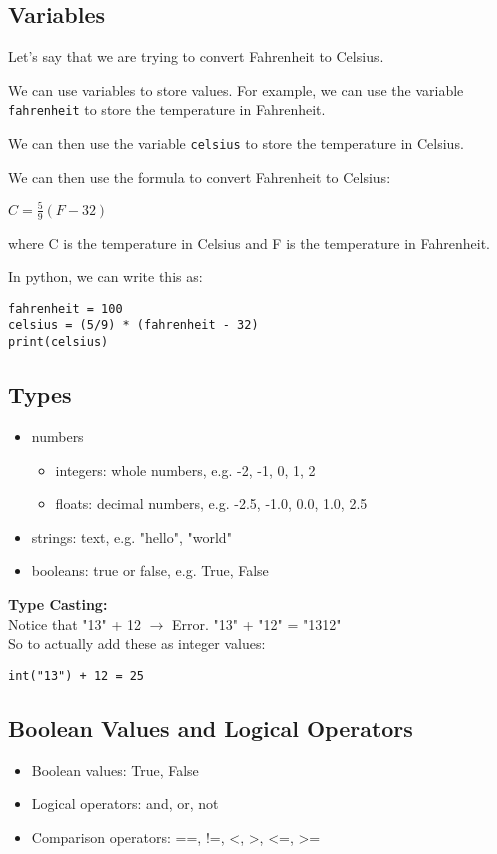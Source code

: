 \documentclass[11pt]{article}
\begin{document}
\subsection{Variables}
Let's say that we are trying to convert Fahrenheit to Celsius.
\begin{itemize}
    \item We can use variables to store values. For example, we can use the variable \texttt{fahrenheit} to store the temperature in Fahrenheit.
    \item We can then use the variable \texttt{celsius} to store the temperature in Celsius.
    \item We can then use the formula to convert Fahrenheit to Celsius: 
    \begin{center}
    \item $C = \frac{5}{9}(F - 32)$
    \end{center}
    where C is the temperature in Celsius and F is the temperature in Fahrenheit.
\end{itemize}
In python, we can write this as:
\begin{verbatim}
fahrenheit = 100
celsius = (5/9) * (fahrenheit - 32)
print(celsius)
\end{verbatim}

\subsection{Types}
\begin{itemize}
    \item numbers
    \begin{itemize}
        \item integers: whole numbers, e.g. -2, -1, 0, 1, 2
        \item floats: decimal numbers, e.g. -2.5, -1.0, 0.0, 1.0, 2.5
    \end{itemize}
    \item strings: text, e.g. "hello", "world"
    \item booleans: true or false, e.g. True, False
\end{itemize}
\textbf{Type Casting:} \\
Notice that "13" + 12 $\longrightarrow$ Error.
"13" + "12" = "1312" \\
So to actually add these as integer values:
\begin{verbatim}
int("13") + 12 = 25
\end{verbatim}
\subsection{Boolean Values and Logical Operators}
\begin{itemize}
    \item Boolean values: True, False
    \item Logical operators: and, or, not
    \item Comparison operators: ==, !=, <, >, <=, >=
\end{itemize}
\end{document}
